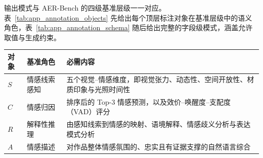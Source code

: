 输出模式与 AER-Bench 的四级基准层级一一对应。表~\ref{tab:app_annotation_objects} 先给出每个顶层标注对象在基准层级中的语义角色，表~\ref{tab:app_annotation_schema} 随后给出完整的字段级模式，涵盖允许取值与生成约束。

\begin{table}[!htbp]
    \centering
    \vspace{0.4em}\wuhao
    \setlength{\tabcolsep}{5pt}
    \renewcommand{\arraystretch}{1.15}
    \begin{tabularx}{\textwidth}{@{}p{}p{}X@{}}
    \toprule
    对象 & 基准角色 & 必需内容 \\
    \midrule
    $S$ & 情感线索感知 & 五个视觉--情感维度，即视觉张力、动态性、空间开放性、材质印象与光照时间性 \\
    $C$ & 情感归因 & 排序后的 Top-3 情感预测，以及效价--唤醒度--支配度（VAD）评分 \\
    $R$ & 解释性推理 & 由感知线索到情感的映射、语境解释、情感歧义分析与表达模式分析 \\
    $A$ & 情感描述 & 对作品整体情感氛围的、忠实且有证据支撑的自然语言综合 \\
    \bottomrule
    \end{tabularx}
\end{table}

